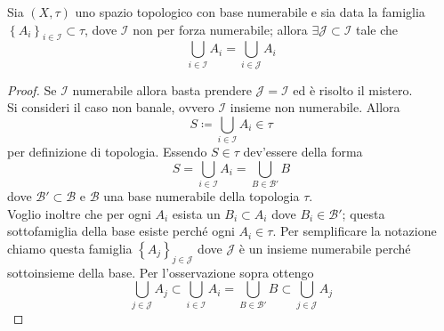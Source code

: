 \begin{theorem}
	Sia $(X,\tau)$ uno spazio topologico con base numerabile e sia data la famiglia $\left\{A_i\right\}_{i\in \mathcal{I}} \subset \tau$, dove $\mathcal{I}$ non per forza numerabile; allora $\exists \mathcal{J} \subset \mathcal{I}$ tale che 
	\begin{equation*}
		\bigcup_{i \in \mathcal{I}} A_i = \bigcup_{i \in \mathcal{J}} A_i
	\end{equation*}
\end{theorem}
\begin{proof}
	Se $\mathcal{I}$ numerabile allora basta prendere $\mathcal{J} = \mathcal{I}$ ed è risolto il mistero.\\
	Si consideri il caso non banale, ovvero $\mathcal{I}$ insieme non numerabile. Allora 
	\begin{equation*}
		S \coloneqq \bigcup_{i \in \mathcal{I}} A_i \in \tau
	\end{equation*}
	per definizione di topologia. Essendo $S \in \tau$ dev'essere della forma
	\begin{equation*}
		S = \bigcup_{i \in \mathcal{I}} A_i = \bigcup_{B \in \mathcal{B}'} B
	\end{equation*}
	dove $\mathcal{B}' \subset \mathcal{B}$ e $\mathcal{B}$ una base numerabile della topologia $\tau$. \\ Voglio inoltre che per ogni $A_i$ esista un $B_i \subset A_i$ dove $B_i \in \mathcal{B}'$; questa sottofamiglia della base esiste perché ogni $A_i \in \tau$. Per semplificare la notazione chiamo questa famiglia $\left\{A_j\right\}_{j \in \mathcal{J}}$ dove $\mathcal{J}$ è un insieme numerabile perché sottoinsieme della base. Per l'osservazione sopra ottengo
	\begin{equation*}
		\bigcup_{j \in \mathcal{J}}  A_j \subset \bigcup_{i \in \mathcal{I}} A_i = \bigcup_{B \in \mathcal{B}'} B \subset \bigcup_{j \in \mathcal{J}}  A_j
	\end{equation*}
\end{proof}



